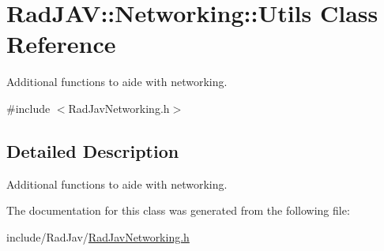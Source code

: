 \hypertarget{class_rad_j_a_v_1_1_networking_1_1_utils}{}\section{Rad\+J\+AV\+:\+:Networking\+:\+:Utils Class Reference}
\label{class_rad_j_a_v_1_1_networking_1_1_utils}


Additional functions to aide with networking.  




{\ttfamily \#include $<$Rad\+Jav\+Networking.\+h$>$}



\subsection{Detailed Description}
Additional functions to aide with networking. 

The documentation for this class was generated from the following file\+:\begin{DoxyCompactItemize}
\item 
include/\+Rad\+Jav/\mbox{\hyperlink{_rad_jav_networking_8h}{Rad\+Jav\+Networking.\+h}}\end{DoxyCompactItemize}
